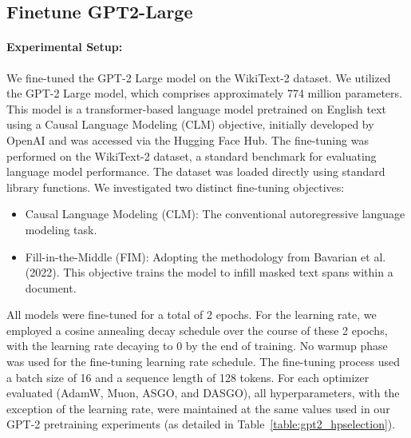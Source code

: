 \documentclass{article}
\theoremstyle{remark}
\begin{document}
\subsection{Finetune GPT2-Large}
\paragraph{Experimental Setup:}
We fine-tuned the GPT-2 Large model on the WikiText-2 dataset. We utilized the GPT-2 Large model, which comprises approximately 774 million parameters. This model is a transformer-based language model pretrained on English text using a Causal Language Modeling (CLM) objective, initially developed by OpenAI and was accessed via the Hugging Face Hub. The fine-tuning was performed on the WikiText-2 dataset, a standard benchmark for evaluating language model performance. The dataset was loaded directly using standard library functions. We investigated two distinct fine-tuning objectives:
\begin{itemize}[leftmargin=*]
    \item Causal Language Modeling (CLM): The conventional autoregressive language modeling task.
    \item Fill-in-the-Middle (FIM): Adopting the methodology from Bavarian et al. (2022). This objective trains the model to infill masked text spans within a document.
\end{itemize}
All models were fine-tuned for a total of 2 epochs. For the learning rate, we employed a cosine annealing decay schedule over the course of these 2 epochs, with the learning rate decaying to 0 by the end of training. No warmup phase was used for the fine-tuning learning rate schedule. The fine-tuning process used a batch size of 16 and a sequence length of 128 tokens. For each optimizer evaluated (AdamW, Muon, ASGO, and DASGO), all hyperparameters, with the exception of the learning rate, were maintained at the same values used in our GPT-2 pretraining experiments (as detailed in Table~\ref{table:gpt2_hpselection}).
\end{document}
